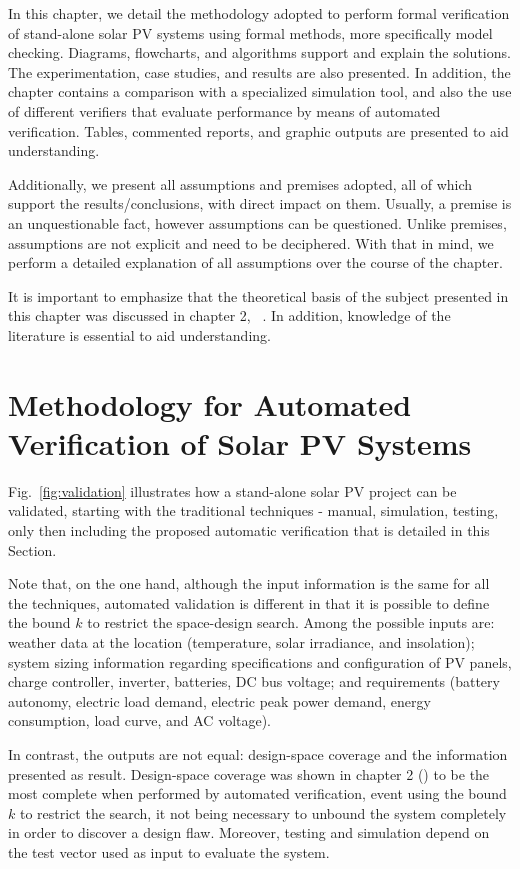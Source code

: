 In this chapter, we detail the methodology adopted to perform formal verification of stand-alone solar PV systems using formal methods, more specifically model checking. Diagrams, flowcharts, and algorithms support and explain the solutions. The experimentation, case studies, and results are also presented. In addition, the chapter contains a comparison with a specialized simulation tool, and also the use of different verifiers that evaluate performance by means of automated verification. Tables, commented reports, and graphic outputs are presented to aid  understanding.

Additionally, we present all assumptions and premises adopted, all of which support the results/conclusions, with direct impact on them. Usually, a premise is an unquestionable fact, however assumptions can be questioned. Unlike premises, assumptions are not explicit and need to be deciphered. With that in mind, we perform a detailed explanation of all assumptions over the course of the chapter.

It is important to emphasize that the theoretical basis of the subject presented in this chapter was discussed in chapter 2, ~. In addition, knowledge of the literature is essential to aid understanding.


\section{Methodology for Automated Verification of Solar PV Systems}

Fig.~\ref{fig:validation} illustrates how a stand-alone solar PV project can be validated, starting with the traditional techniques - manual, simulation, testing, only then including the proposed automatic verification that is detailed in this Section. 

Note that, on the one hand, although the input information is the same for all the techniques, automated validation is different in that it is possible to define the bound $k$ to restrict the space-design search. Among the possible inputs are: weather data at the location (temperature, solar irradiance, and insolation); system sizing information regarding specifications and configuration of PV panels, charge controller, inverter, batteries, DC bus  voltage; and requirements (battery autonomy, electric load demand, electric peak power demand, energy consumption, load curve, and AC voltage).

In contrast, the outputs are not equal: design-space coverage and the information presented as result. Design-space coverage was shown in chapter 2 () to be the most complete when performed by automated verification, event using the bound $k$ to restrict the search, it not being necessary to unbound the system completely in order to discover a design flaw. Moreover, testing and simulation depend on the test vector used as input to evaluate the system.

